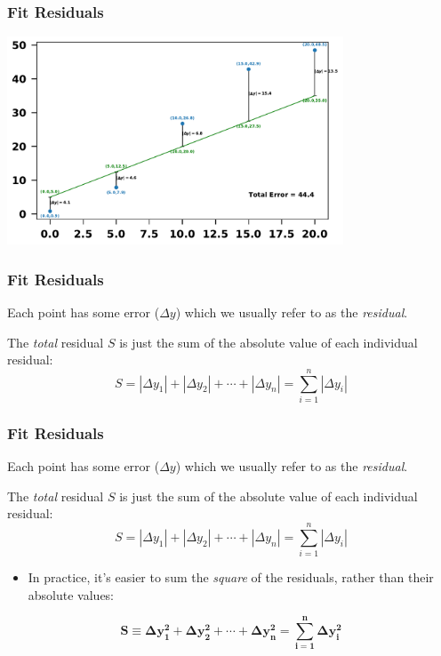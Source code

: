 \documentclass{beamer}
\begin{document}
	\begin{frame}
		\frametitle{Fit Residuals}
		\begin{center}
			\includegraphics[width=10cm]{resid_visual}
		\end{center}
	\end{frame}






	\begin{frame}
		\frametitle{Fit Residuals}
		Each point has some error ($\Delta y$) which we usually refer to as the \textit{residual}.
		
		The \textit{total} residual $S$ is just the sum of the absolute value of each individual residual:
		\begin{equation*}
			S=|\Delta y_1| + |\Delta y_2| + \cdots + |\Delta y_n| = \sum_{i=1}^{n}|\Delta y_i|
		\end{equation*}

	\end{frame}






	\begin{frame}
		\frametitle{Fit Residuals}
	Each point has some error ($\Delta y$) which we usually refer to as the \textit{residual}.
	
	The \textit{total} residual $S$ is just the sum of the absolute value of each individual residual:
	\begin{equation*}
		S=|\Delta y_1| + |\Delta y_2| + \cdots + |\Delta y_n| = \sum_{i=1}^{n}|\Delta y_i|
	\end{equation*}
	\begin{itemize}
		\item  In practice, it's easier to sum the \textit{square} of the residuals, rather than their absolute values:
	\end{itemize}

	\begin{equation*}
		\mathbf{S\equiv\Delta y_1 ^2+ \Delta y_2^2+ \cdots + \Delta y_n^2 = \sum_{i=1}^{n}\Delta y_i^2}
	\end{equation*}
\end{frame}
\end{document}
